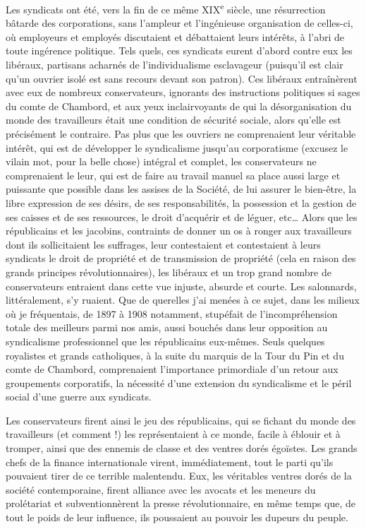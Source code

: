 \documentclass[french,twoside]{book} %
\begin{document}
Les syndicats ont été, vers la fin de ce même XIX\textsuperscript{e} siècle, une résurrection bâtarde des corporations, sans l’ampleur et l’ingénieuse organisation de celles-ci, où employeurs et employés discutaient et débattaient leurs intérêts, à l’abri de toute ingérence politique. Tels quels, ces syndicats eurent d’abord contre eux les libéraux, partisans acharnés de l’individualisme esclavageur (puisqu’il est clair qu’un ouvrier isolé est sans recours devant son patron). Ces libéraux entraînèrent avec eux de nombreux conservateurs, ignorants des instructions politiques si sages du comte de Chambord, et aux yeux inclairvoyants de qui la désorganisation du monde des travailleurs était une condition de sécurité sociale, alors qu’elle est précisément le contraire. Pas plus que les ouvriers ne comprenaient leur véritable intérêt, qui est de développer le syndicalisme jusqu’au corporatisme (excusez le vilain mot, pour la belle chose) intégral et complet, les conservateurs ne comprenaient le leur, qui est de faire au travail manuel sa place aussi large et puissante que possible dans les assises de la Société, de lui assurer le bien-être, la libre expression de ses désirs, de ses responsabilités, la possession et la gestion de ses caisses et de ses ressources, le droit d’acquérir et de léguer, etc… Alors que les républicains et les jacobins, contraints de donner un os à ronger aux travailleurs dont ils sollicitaient les suffrages, leur contestaient et contestaient à leurs syndicats le droit de propriété et de transmission de propriété (cela en raison des grands principes révolutionnaires), les libéraux et un trop grand nombre de conservateurs entraient dans cette vue injuste, absurde et courte. Les salonnards, littéralement, s’y ruaient. Que de querelles j’ai menées à ce sujet, dans les milieux où je fréquentais, de 1897 à 1908 notamment, stupéfait de l’incompréhension totale des meilleurs parmi nos amis, aussi bouchés dans leur opposition au syndicalisme professionnel que les républicains eux-mêmes. Seuls quelques royalistes et grands catholiques, à la suite du marquis de la Tour du Pin et du comte de Chambord, comprenaient l’importance primordiale d’un retour aux groupements corporatifs, la nécessité d’une extension du syndicalisme et le péril social d’une guerre aux syndicats.\par
Les conservateurs firent ainsi le jeu des républicains, qui se fichant du monde des travailleurs (et comment !) les représentaient à ce monde, facile à éblouir et à tromper, ainsi que des ennemis de classe et des ventres dorés égoïstes. Les grands chefs de la finance internationale virent, immédiatement, tout le parti qu’ils pouvaient tirer de ce terrible malentendu. Eux, les véritables ventres dorés de la société contemporaine, firent alliance avec les avocats et les meneurs du prolétariat et subventionnèrent la presse révolutionnaire, en même temps que, de tout le poids de leur influence, ils poussaient au pouvoir les dupeurs du peuple.\par
\end{document}
